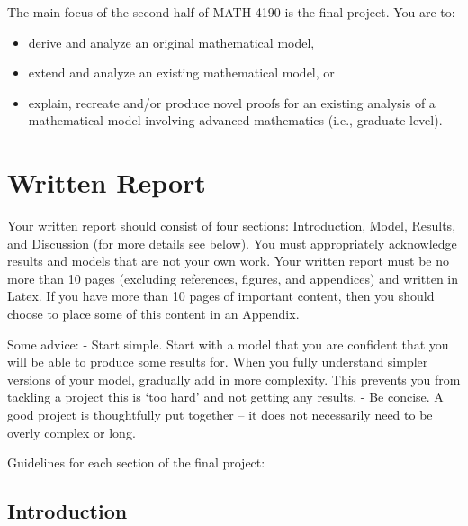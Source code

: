 \documentclass[]{book}
\providecommand{\tightlist}{%
  \setlength{\itemsep}{0pt}\setlength{\parskip}{0pt}}
\begin{document}
The main focus of the second half of MATH 4190 is the final project. You
are to:

\begin{itemize}
\tightlist
\item
  derive and analyze an original mathematical model,
\item
  extend and analyze an existing mathematical model, or
\item
  explain, recreate and/or produce novel proofs for an existing analysis
  of a mathematical model involving advanced mathematics (i.e., graduate
  level).
\end{itemize}

\section{Written Report}\label{written-report}

Your written report should consist of four sections: Introduction,
Model, Results, and Discussion (for more details see below). You must
appropriately acknowledge results and models that are not your own work.
Your written report must be no more than 10 pages (excluding references,
figures, and appendices) and written in Latex. If you have more than 10
pages of important content, then you should choose to place some of this
content in an Appendix.

Some advice: - Start simple. Start with a model that you are confident
that you will be able to produce some results for. When you fully
understand simpler versions of your model, gradually add in more
complexity. This prevents you from tackling a project this is `too hard'
and not getting any results. - Be concise. A good project is
thoughtfully put together -- it does not necessarily need to be overly
complex or long.

Guidelines for each section of the final project:

\subsection{Introduction}\label{introduction}
\end{document}
